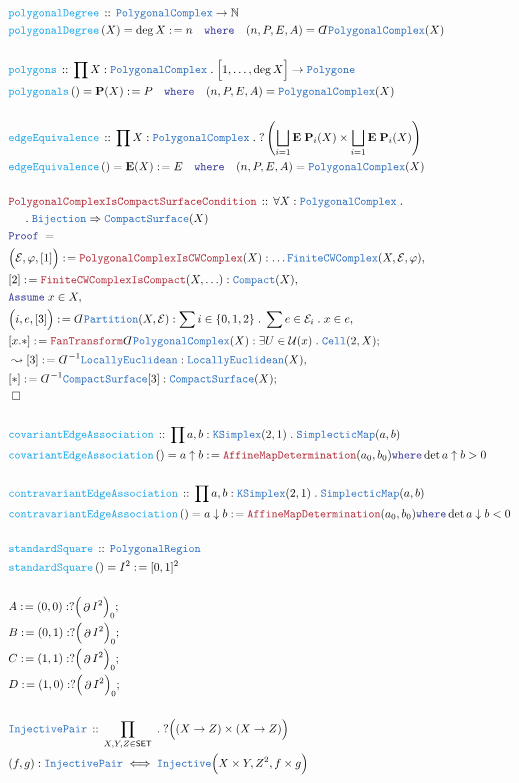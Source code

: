 \documentclass[12pt]{scrartcl}
\newcommand{\TYPE}[1]{\textcolor{NavyBlue}{\mathtt{#1}}}
\newcommand{\FUNC}[1]{\textcolor{Cerulean}{\mathtt{#1}}}
\newcommand{\LOGIC}[1]{\textcolor{Blue}{\mathtt{#1}}}
\newcommand{\THM}[1]{\textcolor{Maroon}{\mathtt{#1}}}
\renewcommand{\.}{\; . \;}
\newcommand{\de}{: \kern 0.1pc =}
\newcommand{\where}{\LOGIC{where}}
\newcommand{\Act}[1]{\left( #1 \right)}
\newcommand{\Theorem}[2]{& \THM{#1} \, :: \, #2 \\ & \Proof = \\ }
\newcommand{\DeclareType}[2]{& \TYPE{#1} \, :: \, #2 \\}
\newcommand{\DefineType}[3]{& #1 : \TYPE{#2} \iff #3 \\}
\newcommand{\DeclareFunc}[2]{& \FUNC{#1} \, :: \, #2 \\}
\newcommand{\DefineNamedFunc}[4]{&  \FUNC{#1}\Act{#2} = #3 \de #4 \\}
\newcommand{\NewLine}{\\ & \kern 1pc}
\newcommand{\Page}[1]{ \begin{align*} #1 \end{align*}   }
\newcommand{ \bd }{ \ByDef }
\newcommand{\Imply}{\Rightarrow}
\newcommand{\Nat}{\mathbb{N} }
\newcommand{\Say}[3]{& #1 \de #2 : #3, \\}
\newcommand{\Conclude}[3]{& #1 \de #2 : #3; \\}
\newcommand{\Derive}[3]{& \leadsto #1 \de #2 : #3, \\}
\newcommand{\AssumeIn}[2]{& \LOGIC{Assume} \; #1 \in #2, \\}
\newcommand{\QED}{\; \square}
\newcommand{\EndProof}{& \QED \\}
\newcommand{\ByDef}{\rotatebox[origin=c]{-180}{$D$}}%
\newcommand{\Proof}{\LOGIC{Proof} \; }
\newcommand{\SET}{\mathsf{SET}}
\DeclareMathOperator*{\boundary}{\partial}
\newcommand{\U}{\mathcal{U}}
\newcommand{\CS}{\TYPE{CompactSurface}}
\newcommand{\E}{\mathcal{E}}
\begin{document}
\Page{	
	\DeclareFunc{polygonalDegree}{\TYPE{PolygonalComplex} \to \Nat}
	\DefineNamedFunc{polygonalDegree}{X}{\deg X}
	{n \quad \where \quad (n,P,E,A) = \bd \TYPE{PolygonalComplex}(X)}
	\\
	\DeclareFunc{polygons}{
		\prod X : \TYPE{PolygonalComplex} \. 
		\Big[1,\ldots,\deg X\Big] \to \TYPE{Polygone}
	}
	\DefineNamedFunc{polygonals}{}{\mathbf{P}(X)}
	{P \quad \where \quad (n,P,E,A) = \TYPE{PolygonalComplex}(X)}
	\\
	\DeclareFunc{edgeEquivalence}{
		\prod X : \TYPE{PolygonalComplex} \. 
		?\left( \bigsqcup_{i=1} \mathbf{E \; P}_i(X) \times \bigsqcup_{i=1} \mathbf{E \; P}_i(X) \right)
	}
	\DefineNamedFunc{edgeEquivalence}{}{\mathbf{E}(X)}
	{E \quad \where \quad (n,P,E,A) = \TYPE{PolygonalComplex}(X)}
	\\
	\Theorem{PolygonalComplexIsCompactSurfaceCondition}
	{
		\forall X : \TYPE{PolygonalComplex} \. \NewLine \. 
		\TYPE{Bijection} \Imply \CS(X)
	}
	\Say{\Big(  \E, \varphi, [1] \Big)}{\THM{PolygonalComplexIsCWComplex}(X)}
	{
		\ldots \TYPE{FiniteCWComplex}(X,\E,\varphi)
	}
	\Say{[2]}{\THM{FiniteCWComplexIsCompact}(X,\ldots)}
	{
		\TYPE{Compact}(X)
	}
	\AssumeIn{x}{X}
	\Say{\Big(i,e,[3]\Big)}{\bd \TYPE{Partition}(X,\E)}
	{
		\sum i \in \{0,1,2\} \. 
		\sum e \in \E_i \.
		x \in e
	}
	\Conclude{[x.*]}{\THM{FanTransform}\bd \TYPE{PolygonalComplex}(X)}
	{
		\exists U \in \U(x) \. \TYPE{Cell}(2,X)
	}
	\Derive{[3]}{\bd^{-1}\TYPE{LocallyEuclidean}}{\TYPE{LocallyEuclidean}(X)}
	\Conclude{[*]}{\bd^{-1}\CS[3]}{\CS(X)}
	\EndProof
	\\
	\DeclareFunc{covariantEdgeAssociation}{\prod a,b : \TYPE{KSimplex}(2,1) \. \TYPE{SimplecticMap}(a,b) }
	\DefineNamedFunc{covariantEdgeAssociation}{}{a \uparrow b}{\THM{AffineMapDetermination}(a_0,b_0) \where \det a \uparrow b > 0}
	\\
	\DeclareFunc{contravariantEdgeAssociation}{\prod a,b : \TYPE{KSimplex}(2,1) \. \TYPE{SimplecticMap}(a,b) }
	\DefineNamedFunc{contravariantEdgeAssociation}{}{a \downarrow b}{\THM{AffineMapDetermination}(a_0,b_0) \where \det a \downarrow b < 0}
	\\
	\DeclareFunc{standardSquare}{\TYPE{PolygonalRegion}}
	\DefineNamedFunc{standardSquare}{}{I^2}{[0,1]^2}
	\\
	\Conclude{A}{(0,0)}{?\Big(\boundary I^2\Big)_0}
	\Conclude{B}{(0,1)}{?\Big(\boundary I^2\Big)_0}
	\Conclude{C}{(1,1)}{?\Big( \boundary I^2\Big)_0}
	\Conclude{D}{(1,0)}{?\Big( \boundary I^2 \Big)_0 }
	\\
	\DeclareType{InjectivePair}{\prod_{ X,Y,Z \in \SET } \. ?\Big( (X \to Z) \times (X \to Z)\Big)}
	\DefineType{(f,g)}{InjectivePair}{\TYPE{Injective}\Big( X \times Y,Z^2,f \times g \Big)}
}
\end{document}
